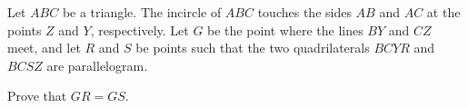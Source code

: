 Let $ABC$ be a triangle. The incircle of $ABC$ touches the sides $AB$ and $AC$ at the points $Z$ and $Y$,  respectively. Let $G$ be the point where the lines $BY$ and $CZ$ meet, and let $R$ and $S$ be points such that the two quadrilaterals $BCYR$ and $BCSZ$ are parallelogram.

Prove that $GR=GS$.